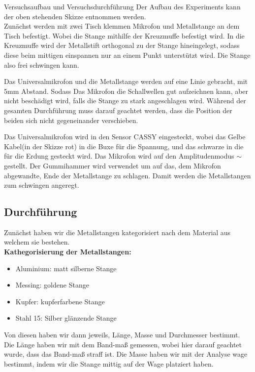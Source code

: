 \documentclass[twoside]{protokoll}
\begin{document}
\begin{aufgabe}{Versuchsaufbau und Versuchsdurchführung}
Der Aufbau des Experiments kann der oben stehenden Skizze entnommen werden. \\


Zunächst werden mit zwei Tisch klemmen Mikrofon und Metallstange an dem Tisch befestigt. Wobei die Stange mithilfe der Kreuzmuffe befestigt wird. In die Kreuzmuffe wird der Metallstift orthogonal zu der Stange hineingelegt, sodass diese beim mittigen einspannen nur an einem Punkt unterstützt wird. Die Stange also frei schwingen kann. 

Das Universalmikrofon und die Metallstange werden auf eine Linie gebracht, mit 5mm Abstand. Sodass Das Mikrofon die Schallwellen gut aufzeichnen kann, aber nicht beschädigt wird, falls die Stange zu stark angeschlagen wird. Während der gesamten Durchführung muss darauf geachtet werden, dass die Position der beiden sich nicht gegeneinander verschieben. 


Das Universalmikrofon wird in den Sensor CASSY eingesteckt, wobei das Gelbe Kabel(in der Skizze rot) in die Buxe für die Spannung, und das schwarze in die für die Erdung gesteckt wird. Das Mikrofon wird auf den Amplitudenmodus $\sim$ gestellt. Der Gummihammer wird verwendet um auf das, dem Mikrofon abgewandte, Ende der Metallstange zu schlagen. Damit werden die Metallstangen zum schwingen angeregt.

\subsection{Durchführung}

Zunächst haben wir die Metallstangen kategorisiert nach dem Material aus welchem sie bestehen.\\

\textbf{Kathegorisierung der Metallstangen:}

\begin{itemize}
\item Aluminium:		 matt silberne Stange 
\item Messing:		 goldene Stange
\item Kupfer:			 kupferfarbene Stange
\item Stahl 15:		 Silber glänzende Stange
\end{itemize}

Von diesen haben wir dann jeweils, Länge, Masse und Durchmesser bestimmt. 
Die Länge haben wir mit dem Band-maß gemessen, wobei hier darauf geachtet wurde, dass das Band-maß straff ist. Die Masse haben wir mit der Analyse wage bestimmt, indem wir die Stange mittig auf der Wage platziert haben. 



\end{aufgabe}
\end{document}
